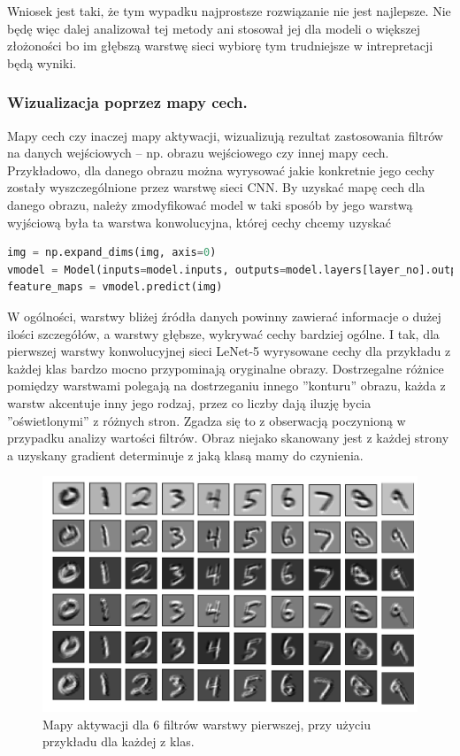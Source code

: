 Wniosek jest taki, że tym wypadku najprostsze rozwiązanie nie jest najlepsze. Nie będę więc dalej analizował tej metody ani stosował jej dla modeli o większej złożoności bo im głębszą warstwę sieci wybiorę tym trudniejsze w intrepretacji będą wyniki.

\subsubsection{Wizualizacja poprzez mapy cech.}
Mapy cech czy inaczej mapy aktywacji, wizualizują rezultat zastosowania filtrów na danych wejściowych -- np. obrazu wejściowego czy innej mapy cech. Przykładowo, dla danego obrazu można wyrysować jakie konkretnie jego cechy zostały wyszczególnione przez warstwę sieci CNN. 
By uzyskać mapę cech dla danego obrazu, należy zmodyfikować model w taki sposób by jego warstwą wyjściową była ta warstwa konwolucyjna, której cechy chcemy uzyskać

\label{lst:lenet5keras-mapy}
\begin{lstlisting}[language=Python, caption={Uzyskiwanie mapy aktywacji dla danego modelu i obrazu w Keras.}, captionpos=b]
img = np.expand_dims(img, axis=0)
vmodel = Model(inputs=model.inputs, outputs=model.layers[layer_no].output)
feature_maps = vmodel.predict(img)
\end{lstlisting}

W ogólności, warstwy bliżej źródła danych powinny zawierać informacje o dużej ilości szczegółów, a warstwy głębsze, wykrywać cechy bardziej ogólne. I tak, 
dla pierwszej warstwy konwolucyjnej sieci LeNet-5 wyrysowane cechy dla przykładu z każdej klas bardzo mocno przypominają oryginalne obrazy. Dostrzegalne różnice pomiędzy warstwami polegają na dostrzeganiu innego ''konturu'' obrazu, każda z warstw akcentuje inny jego rodzaj, przez co liczby dają iluzję bycia ''oświetlonymi'' z różnych stron.
Zgadza się to z obserwacją poczynioną w przypadku analizy wartości filtrów. Obraz niejako skanowany jest z każdej strony a uzyskany gradient determinuje z jaką klasą mamy do czynienia.

\begin{figure}[ht]
\centerline{\includegraphics[scale=0.25]{resources/first_layer_gd_lenet.png}}
\caption{Mapy aktywacji dla 6 filtrów warstwy pierwszej, przy użyciu przykładu dla każdej z klas.}
\label{fig:lenet5-mapy-aktywacji-l1}
\end{figure}

